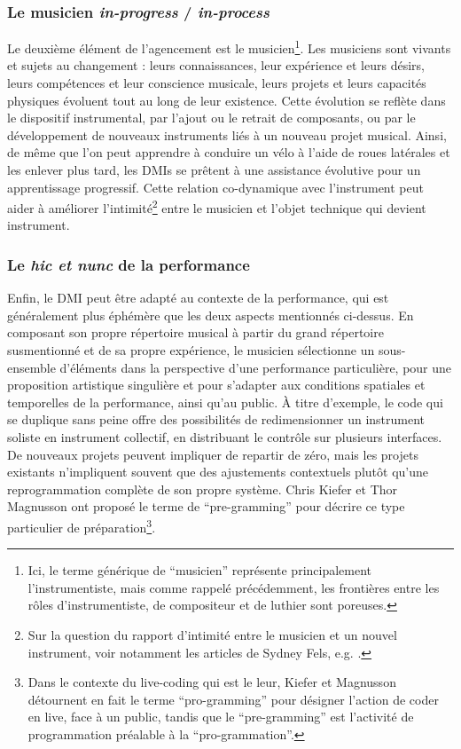 \subsubsection{Le musicien \textit{in-progress} / \textit{in-process}}

\noindent Le deuxième élément de l'agencement est le musicien\footnote{Ici, le terme générique de ``musicien'' représente principalement l'instrumentiste, mais comme rappelé précédemment, les frontières entre les rôles d'instrumentiste, de compositeur et de luthier sont poreuses.}. Les musiciens sont vivants et sujets au changement : leurs connaissances, leur expérience et leurs désirs, leurs compétences et leur conscience musicale, leurs projets et leurs capacités physiques évoluent tout au long de leur existence. Cette évolution se reflète dans le dispositif instrumental, par l'ajout ou le retrait de composants, ou par le développement de nouveaux instruments liés à un nouveau projet musical. Ainsi, de même que l'on peut apprendre à conduire un vélo à l'aide de roues latérales et les enlever plus tard, les \glspl{DMI} se prêtent à une assistance évolutive pour un apprentissage progressif. Cette relation co-dynamique avec l'instrument peut aider à améliorer l'intimité\footnote{Sur la question du rapport d'intimité entre le musicien et un nouvel instrument, voir notamment les articles de Sydney Fels, e.g. \cite{fels_designing_2004}.} entre le musicien et l'objet technique qui devient instrument.

\subsubsection{Le \textit{hic et nunc} de la performance}

\noindent Enfin, le \gls{DMI} peut être adapté au contexte de la performance, qui est généralement plus éphémère que les deux aspects mentionnés ci-dessus.
En composant son propre répertoire musical à partir du grand répertoire susmentionné et de sa propre expérience, le musicien sélectionne un sous-ensemble d'éléments dans la perspective d'une performance particulière, pour une proposition artistique singulière et pour s'adapter aux conditions spatiales et temporelles de la performance, ainsi qu'au public. À titre d'exemple, le code qui se duplique sans peine offre des possibilités de redimensionner un instrument soliste en instrument collectif, en distribuant le contrôle sur plusieurs interfaces. De nouveaux projets peuvent impliquer de repartir de zéro, mais les projets existants n'impliquent souvent que des ajustements contextuels plutôt qu'une reprogrammation complète de son propre système. Chris Kiefer et Thor Magnusson ont proposé le terme de ``pre-gramming'' \cite{kiefer_live_2019} pour décrire ce type particulier de préparation\footnote{Dans le contexte du live-coding qui est le leur, Kiefer et Magnusson détournent en fait le terme ``pro-gramming'' pour désigner l'action de coder en live, face à un public, tandis que le ``pre-gramming'' est l'activité de programmation préalable à la ``pro-grammation''.}.
	

